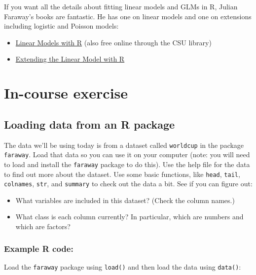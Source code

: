 \documentclass[]{book}
\providecommand{\tightlist}{%
  \setlength{\itemsep}{0pt}\setlength{\parskip}{0pt}}
\theoremstyle{definition}
\theoremstyle{definition}
\theoremstyle{definition}
\theoremstyle{remark}
\begin{document}
If you want all the details about fitting linear models and GLMs in R,
Julian Faraway's books are fantastic. He has one on linear models and
one on extensions including logistic and Poisson models:

\begin{itemize}
\tightlist
\item
  \href{http://discovery.library.colostate.edu/Record/.b41119691}{Linear
  Models with R} (also free online through the CSU library)
\item
  \href{http://www.amazon.com/Extending-Linear-Model-Generalized-Nonparametric/dp/158488424X/ref=sr_1_1?ie=UTF8\&qid=1442252668\&sr=8-1\&keywords=extending+linear+model+r}{Extending
  the Linear Model with R}
\end{itemize}

\section{In-course exercise}\label{in-course-exercise-2}

\subsection{Loading data from an R
package}\label{loading-data-from-an-r-package}

The data we'll be using today is from a dataset called \texttt{worldcup}
in the package \texttt{faraway}. Load that data so you can use it on
your computer (note: you will need to load and install the
\texttt{faraway} package to do this). Use the help file for the data to
find out more about the dataset. Use some basic functions, like
\texttt{head}, \texttt{tail}, \texttt{colnames}, \texttt{str}, and
\texttt{summary} to check out the data a bit. See if you can figure out:

\begin{itemize}
\tightlist
\item
  What variables are included in this dataset? (Check the column names.)
\item
  What class is each column currently? In particular, which are numbers
  and which are factors?
\end{itemize}

\subsubsection{Example R code:}\label{example-r-code}

Load the \texttt{faraway} package using \texttt{load()} and then load
the data using \texttt{data()}:
\end{document}

